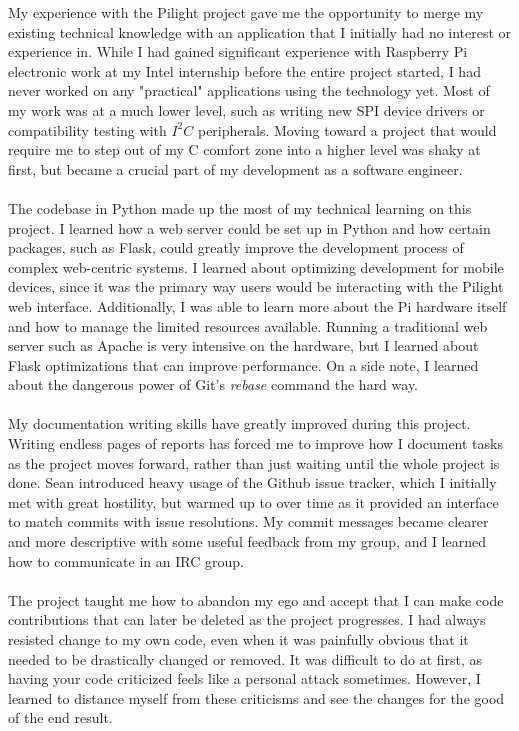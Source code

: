 My experience with the Pilight project gave me the opportunity to merge my existing technical knowledge with an application that I initially had no interest or experience in. While I had gained significant experience with Raspberry Pi electronic work at my Intel internship before the entire project started, I had never worked on any "practical" applications using the technology yet. Most of my work was at a much lower level, such as writing new SPI device drivers or compatibility testing with $I^{2}C$ peripherals. Moving toward a project that would require me to step out of my C comfort zone into a higher level was shaky at first, but became a crucial part of my development as a software engineer.\\\\
The codebase in Python made up the most of my technical learning on this project. I learned how a web server could be set up in Python and how certain packages, such as Flask, could greatly improve the development process of complex web-centric systems. I learned about optimizing development for mobile devices, since it was the primary way users would be interacting with the Pilight web interface. Additionally, I was able to learn more about the Pi hardware itself and how to manage the limited resources available. Running a traditional web server such as Apache is very intensive on the hardware, but I learned about Flask optimizations that can improve performance. On a side note, I learned about the dangerous power of Git's \textit{rebase} command the hard way. \\\\
My documentation writing skills have greatly improved during this project. Writing endless pages of reports has forced me to improve how I document tasks as the project moves forward, rather than just waiting until the whole project is done. Sean introduced heavy usage of the Github issue tracker, which I initially met with great hostility, but warmed up to over time as it provided an interface to match commits with issue resolutions. My commit messages became clearer and more descriptive with some useful feedback from my group, and I learned how to communicate in an IRC group.\\\\
The project taught me how to abandon my ego and accept that I can make code contributions that can later be deleted as the project progresses. I had always resisted change to my own code, even when it was painfully obvious that it needed to be drastically changed or removed. It was difficult to do at first, as having your code criticized feels like a personal attack sometimes. However, I learned to distance myself from these criticisms and see the changes for the good of the end result.\\\\
